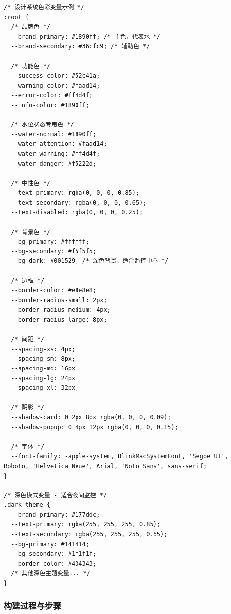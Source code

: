 \begin{lstlisting}
/* 设计系统色彩变量示例 */
:root {
  /* 品牌色 */
  --brand-primary: #1890ff; /* 主色，代表水 */
  --brand-secondary: #36cfc9; /* 辅助色 */
  
  /* 功能色 */
  --success-color: #52c41a;
  --warning-color: #faad14;
  --error-color: #ff4d4f;
  --info-color: #1890ff;
  
  /* 水位状态专用色 */
  --water-normal: #1890ff;
  --water-attention: #faad14;
  --water-warning: #ff4d4f;
  --water-danger: #f5222d;
  
  /* 中性色 */
  --text-primary: rgba(0, 0, 0, 0.85);
  --text-secondary: rgba(0, 0, 0, 0.65);
  --text-disabled: rgba(0, 0, 0, 0.25);
  
  /* 背景色 */
  --bg-primary: #ffffff;
  --bg-secondary: #f5f5f5;
  --bg-dark: #001529; /* 深色背景，适合监控中心 */
  
  /* 边框 */
  --border-color: #e8e8e8;
  --border-radius-small: 2px;
  --border-radius-medium: 4px;
  --border-radius-large: 8px;
  
  /* 间距 */
  --spacing-xs: 4px;
  --spacing-sm: 8px;
  --spacing-md: 16px;
  --spacing-lg: 24px;
  --spacing-xl: 32px;
  
  /* 阴影 */
  --shadow-card: 0 2px 8px rgba(0, 0, 0, 0.09);
  --shadow-popup: 0 4px 12px rgba(0, 0, 0, 0.15);
  
  /* 字体 */
  --font-family: -apple-system, BlinkMacSystemFont, 'Segoe UI', Roboto, 'Helvetica Neue', Arial, 'Noto Sans', sans-serif;
}

/* 深色模式变量 - 适合夜间监控 */
.dark-theme {
  --brand-primary: #177ddc;
  --text-primary: rgba(255, 255, 255, 0.85);
  --text-secondary: rgba(255, 255, 255, 0.65);
  --bg-primary: #141414;
  --bg-secondary: #1f1f1f;
  --border-color: #434343;
  /* 其他深色主题变量... */
}
\end{lstlisting}

\subsubsection{构建过程与步骤}\label{ux6784ux5efaux8fc7ux7a0bux4e0eux6b65ux9aa4}

